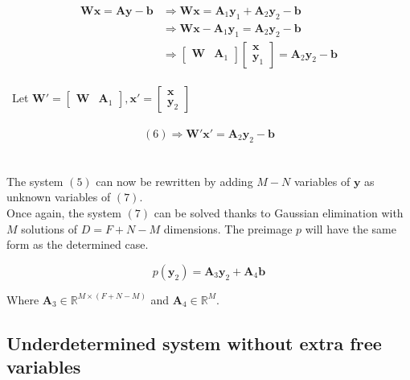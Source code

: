 \documentclass{article}
\begin{document}
\begin{equation}
    \begin{split}
        \textbf{W}\textbf{x}  =\textbf{Ay}-\textbf{b} &\Rightarrow 
        \textbf{W}\textbf{x}  = \textbf{A}_{1}\textbf{y}_{1}  + \textbf{A}_{2}\textbf{y}_{2} -\textbf{b}\\
         & \Rightarrow  \textbf{W}\textbf{x}-\textbf{A}_{1}\textbf{y}_{1} = \textbf{A}_{2}\textbf{y}_{2}-\textbf{b} \\
         & \Rightarrow \begin{bmatrix}\textbf{W}&\textbf{A}_{1} \end{bmatrix} \begin{bmatrix}\textbf{x} \\\textbf{y}_{1} 
        \end{bmatrix} =\textbf{A}_{2}\textbf{y}_{2}-\textbf{b}
        \end{split}
\end{equation} 
\\
\
Let $\textbf{W}'= \begin{bmatrix}\textbf{W}&\textbf{A}_{1} \end{bmatrix},\textbf{x}' = \begin{bmatrix}\textbf{x} \\\textbf{y}_{2} \end{bmatrix}$
\\\\
\begin{equation}
    (6) \Rightarrow \textbf{W}'\textbf{x}' =\textbf{A}_{2}\textbf{y}_{2}-\textbf{b}
\end{equation}
\\
\\
The system $(5)$ can now be rewritten by adding $M-N$ variables of $\textbf{y}$ as unknown variables of $(7)$.\\ 
Once again, the system $(7)$ can be solved thanks to Gaussian elimination with $M$ solutions of $D=F+N-M$ dimensions.
The preimage $p$ will have the same form as the determined case.

\begin{equation*}
p(\textbf{y}_{2})= \textbf{A}_{3}\textbf{y}_{2} + \textbf{A}_{4}\textbf{b}
\end{equation*}

Where $\textbf{A}_{3} \in  \mathbb{R}^{M \times (F+N-M)}$ and $\textbf{A}_{4} \in  \mathbb{R}^{M}.$

\subsection{Underdetermined system without extra free variables}
\end{document}
